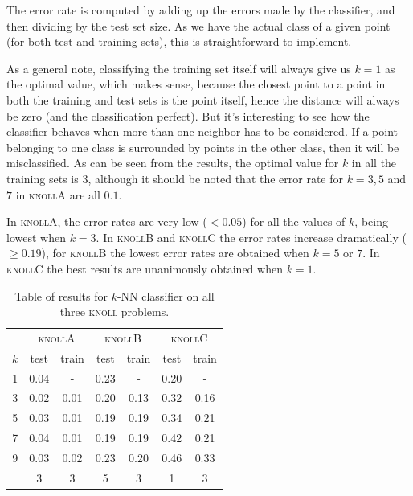 \documentclass{article}
\newcommand{\knollA}{\textsc{knollA}\xspace}
\newcommand{\knollB}{\textsc{knollB}\xspace}
\newcommand{\knollC}{\textsc{knollC}\xspace}
\begin{document}
The error rate is computed by adding up the errors made by the
classifier, and then dividing by the test set size. As we have the
actual class of a given point (for both test and training sets), this
is straightforward to implement.

As a general note, classifying the training set itself will always
give us $k = 1$ as the optimal value, which makes sense, because the
closest point to a point in both the training and test sets is the
point itself, hence the distance will always be zero (and the
classification perfect). But it's interesting to see how the
classifier behaves when more than one neighbor has to be
considered. If a point belonging to one class is surrounded by points
in the other class, then it will be misclassified. As can be seen from
the results, the optimal value for $k$ in all the training sets is $3$,
although it should be noted that the error rate for $k = 3,5$ and $7$
in \knollA are all $0.1$.

In \knollA, the error rates are very low ($< 0.05$) for all the values of $k$,
being lowest when $k = 3$. In \knollB and \knollC the error rates
increase dramatically ($\geq 0.19$), for \knollB the lowest error rates are obtained
when $k = 5$ or $7$. In \knollC the best results are unanimously
obtained when $k = 1$.

\begin{table}
  \centering
  \begin{tabular}{c | c|c | c|c | c|c}
    \hfill & \multicolumn{2}{c|}{\knollA} & \multicolumn{2}{c|}{\knollB} & \multicolumn{2}{c}{\knollC}\\
    $k$ & test & train & test & train & test & train\\\hline
    1 & 0.04 &   -  & 0.23 &   -  & 0.20 &   - \\
    3 & 0.02 & 0.01 & 0.20 & 0.13 & 0.32 & 0.16\\
    5 & 0.03 & 0.01 & 0.19 & 0.19 & 0.34 & 0.21\\
    7 & 0.04 & 0.01 & 0.19 & 0.19 & 0.42 & 0.21\\
    9 & 0.03 & 0.02 & 0.23 & 0.20 & 0.46 & 0.33\\\hline\hline
    \hfill & 3 & 3  &   5  &   3  &   1  &   3 
  \end{tabular}
  \caption{Table of results for $k$-NN classifier on all three \textsc{knoll} problems.}
  \label{tbl:results1}
\end{table}
\end{document}
